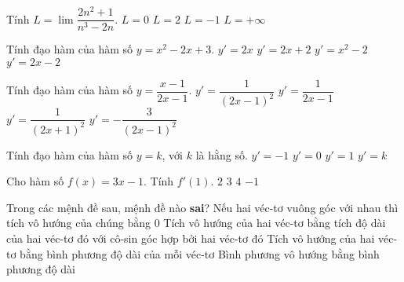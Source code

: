 \begin{ex}%
	Tính $L=\lim\limits\dfrac{2n^2+1}{n^3-2n}$.
	\choice
	{\True $L=0 $}
	{$L=2 $}
	{$L=-1 $}
	{$L=+\infty $}
\end{ex}

\begin{ex}%
	Tính đạo hàm của hàm số $y=x^2-2x+3$.
	\choice
	{$y'=2x $}
	{$y'=2x+2 $}
	{$y'=x^2-2 $}
	{\True $y'=2x-2 $}
\end{ex}

\begin{ex}%
	Tính đạo hàm của hàm số $y=\dfrac{x-1}{2x-1}$.
	\choice
	{\True $y'=\dfrac{1}{(2x-1)^2} $}
	{$y'=\dfrac{1}{2x-1} $}
	{$y'=\dfrac{1}{(2x+1)^2} $}
	{$y'=-\dfrac{3}{(2x-1)^2} $}
\end{ex}

\begin{ex}%
	Tính đạo hàm của hàm số $y=k$, với $k$ là hằng số.
	\choice
	{$y'=-1 $}
	{\True $y'=0 $}
	{$y'=1 $}
	{$y'=k $}
\end{ex}

\begin{ex}%
	Cho hàm số $f(x)=3x-1$. Tính $f'(1)$.
	\choice
	{$2 $}
	{\True $3 $}
	{$4 $}
	{$-1 $}
\end{ex}

\begin{ex}%
	Trong các mệnh đề sau, mệnh đề nào \textbf{sai}?
	\choice
	{Nếu hai véc-tơ vuông góc với nhau thì tích vô hướng của chúng bằng $0$}
	{Tích vô hướng của hai véc-tơ bằng tích độ dài của hai véc-tơ đó với cô-sin góc hợp bởi hai véc-tơ đó}
	{\True Tích vô hướng của hai véc-tơ bằng bình phương độ dài của mỗi véc-tơ}
	{Bình phương vô hướng bằng bình phương độ dài}
\end{ex}

